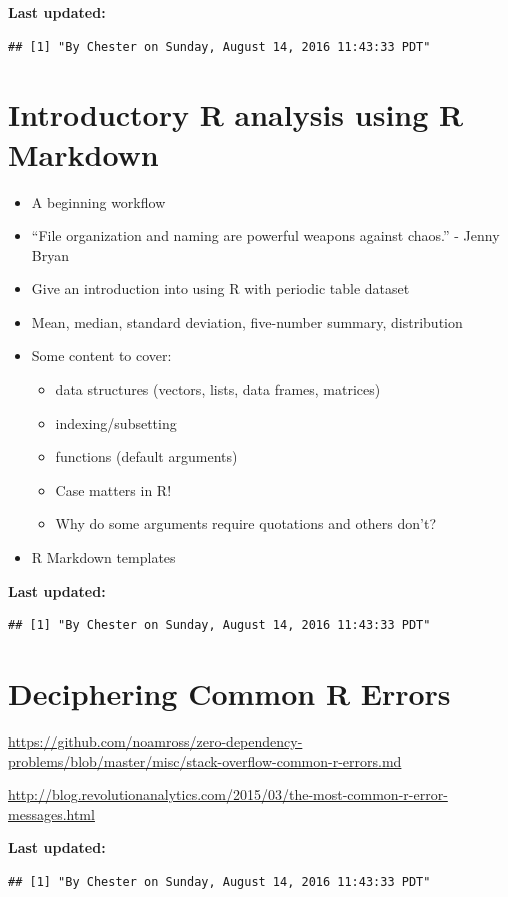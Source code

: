 \documentclass[]{tufte-book}
\providecommand{\tightlist}{%
  \setlength{\itemsep}{0pt}\setlength{\parskip}{0pt}}
\begin{document}
\textbf{Last updated:}

\begin{verbatim}
## [1] "By Chester on Sunday, August 14, 2016 11:43:33 PDT"
\end{verbatim}

\chapter{Introductory R analysis using R Markdown}\label{rmdanal}

\begin{itemize}
\tightlist
\item
  A beginning workflow
\item
  ``File organization and naming are powerful weapons against chaos.'' -
  Jenny Bryan
\item
  Give an introduction into using R with periodic table dataset
\item
  Mean, median, standard deviation, five-number summary, distribution
\item
  Some content to cover:

  \begin{itemize}
  \tightlist
  \item
    data structures (vectors, lists, data frames, matrices)
  \item
    indexing/subsetting
  \item
    functions (default arguments)
  \item
    Case matters in R!
  \item
    Why do some arguments require quotations and others don't?
  \end{itemize}
\item
  R Markdown templates
\end{itemize}

\textbf{Last updated:}

\begin{verbatim}
## [1] "By Chester on Sunday, August 14, 2016 11:43:33 PDT"
\end{verbatim}

\chapter{Deciphering Common R Errors}\label{errors}

\url{https://github.com/noamross/zero-dependency-problems/blob/master/misc/stack-overflow-common-r-errors.md}

\url{http://blog.revolutionanalytics.com/2015/03/the-most-common-r-error-messages.html}

\textbf{Last updated:}

\begin{verbatim}
## [1] "By Chester on Sunday, August 14, 2016 11:43:33 PDT"
\end{verbatim}


\end{document}
